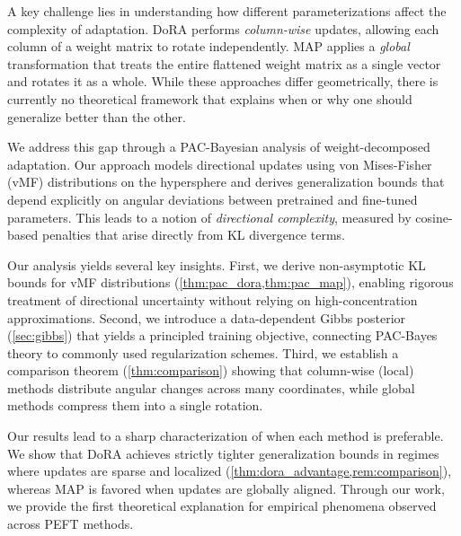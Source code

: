 \documentclass[11pt]{article}
\begin{document}
A key challenge lies in understanding how different parameterizations affect
the complexity of adaptation.
DoRA performs \emph{column-wise} updates, allowing each column of a weight
matrix to rotate independently.
MAP applies a \emph{global} transformation that treats the
entire flattened weight matrix as a single vector and rotates it as a whole.
While these approaches differ geometrically, there is currently no
theoretical framework that explains when or why one should generalize better than
the other.

\begin{sloppypar}
We address this gap through a PAC-Bayesian analysis of weight-decomposed adaptation.
Our approach models directional updates using von Mises-Fisher (vMF) distributions on the hypersphere and derives generalization bounds that depend explicitly on angular deviations between pretrained and fine-tuned parameters.
This leads to a notion of \emph{directional complexity}, measured by cosine-based penalties that arise directly from KL divergence terms.
\end{sloppypar}


Our analysis yields several key insights.
First, we derive non-asymptotic KL bounds for vMF distributions
(\cref{thm:pac_dora,thm:pac_map}), enabling rigorous treatment of
directional uncertainty without relying on high-concentration
approximations.
Second, we introduce a data-dependent Gibbs posterior
(\cref{sec:gibbs}) that yields a principled training objective,
connecting PAC-Bayes theory to commonly used regularization schemes.
Third, we establish a comparison theorem (\cref{thm:comparison})
showing that column-wise (local) methods distribute angular
changes across many coordinates, while global methods compress them
into a single rotation.

Our results lead to a sharp characterization of when each method is
preferable.
We show that DoRA achieves strictly tighter generalization bounds in regimes
where updates are sparse and localized (\cref{thm:dora_advantage,rem:comparison}),
whereas MAP is favored when updates are globally aligned.
Through our work, we provide the first theoretical explanation for empirical phenomena
observed across PEFT methods.
\end{document}
